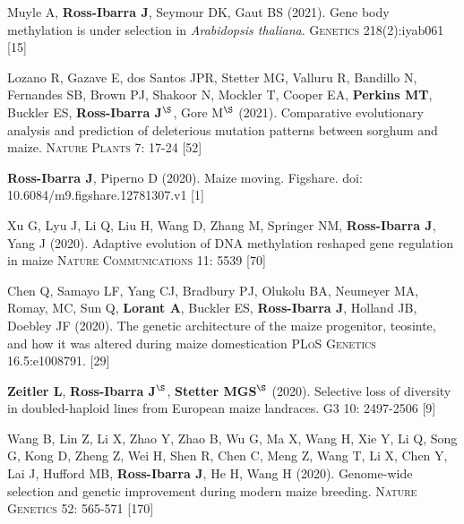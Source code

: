 \documentclass[letterpaper,10pt]{article}
\begin{document}
\begin{etaremune}
\item Muyle A, \textbf{Ross-Ibarra J}, Seymour DK, Gaut BS (2021). Gene body methylation is under selection in \textit{Arabidopsis thaliana}. \textsc{Genetics} 218(2):iyab061 %
 [15]\\

\item Lozano R, Gazave E, dos Santos JPR, Stetter MG, Valluru R, Bandillo N, Fernandes SB, Brown PJ, Shakoor N, Mockler T, Cooper EA, \textbf{Perkins MT}, Buckler ES, \textbf{Ross-Ibarra J}$^\S$, Gore M$^\S$ (2021). Comparative evolutionary analysis and prediction of deleterious mutation patterns between sorghum and maize. \textsc{Nature Plants} 7: 17-24  %
 [52]\\

\item \textbf{Ross-Ibarra J}, Piperno D (2020). Maize moving. Figshare. doi: 10.6084/m9.figshare.12781307.v1 [1] 
\newline

\item Xu G, Lyu J, Li Q, Liu H, Wang D, Zhang M, Springer NM, \textbf{Ross-Ibarra J}, Yang J (2020). Adaptive evolution of DNA methylation reshaped gene regulation in maize \textsc{Nature Communications} 11: 5539
 [70]\\

\item Chen Q, Samayo LF, Yang CJ, Bradbury PJ, Olukolu BA, Neumeyer MA, Romay, MC, Sun Q, \textbf{Lorant A}, Buckler ES, \textbf{Ross-Ibarra J}, Holland JB, Doebley JF (2020).
The genetic architecture of the maize progenitor, teosinte, and how it was altered during maize domestication \textsc{PLoS Genetics} 16.5:e1008791.
 [29]\\

\item \textbf{Zeitler L}, \textbf{Ross-Ibarra J}$^\S$, \textbf{Stetter MGS}$^\S$ (2020). Selective loss of diversity in doubled-haploid lines from European maize landraces. \textsc{G3} 10: 2497-2506
 [9]\\

\item Wang B, Lin Z, Li X, Zhao Y, Zhao B, Wu G, Ma X, Wang H, Xie Y, Li Q, Song G, Kong D, Zheng Z, Wei H, Shen R, Chen C, Meng Z, Wang T, Li X, Chen Y, Lai J, Hufford MB, \textbf{Ross-Ibarra J}, He H, Wang H (2020). Genome-wide selection and genetic improvement during modern maize breeding. \textsc{Nature Genetics} 52: 565-571
 [170]\\


\end{etaremune}
\end{document}
